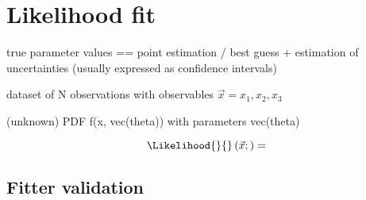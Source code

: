
\section{Likelihood fit}
\label{sec:measurement_of_sin2beta:likelihood_fit}

true parameter values == point estimation / best guess
+ estimation of uncertainties (usually expressed as confidence intervals)

dataset of N observations with observables $\vec{x} = {x_1, x_2, x_3}$

(unknown) PDF f(x, vec(theta)) with parameters vec(theta)

\begin{equation}\label{sec:measurement_of_sin2beta:likelihood_fit:unbinned_extended_ML}
  \Likelihood{}{}\left(\vec{x};\right) = 
\end{equation}

\subsection{Fitter validation}
\label{sec:measurement_of_sin2beta:likelihood_fit:validation}
